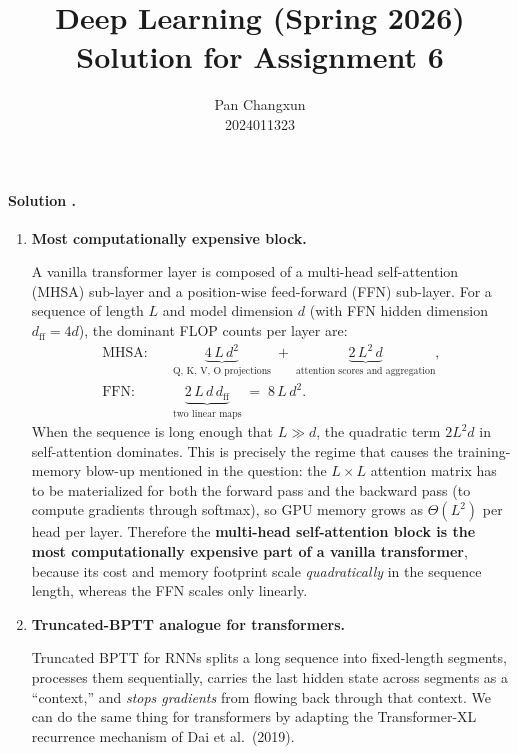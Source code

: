 \documentclass{article}
\title{
    Deep Learning (Spring 2026) \\
    Solution for Assignment 6
}
\author{
    Pan Changxun
    \\
    2024011323
}
\newcounter{solutionCount}
\newcommand{\solution}[1]{
    \stepcounter{solutionCount}
    \paragraph{Solution \thesolutionCount.}
    {
        #1
    }
}
\begin{document}
\maketitle

\solution{
    \begin{enumerate}
        \item \textbf{Most computationally expensive block.}

        A vanilla transformer layer is composed of a multi-head self-attention (MHSA) sub-layer and a position-wise feed-forward (FFN) sub-layer. For a sequence of length $L$ and model dimension $d$ (with FFN hidden dimension $d_{\mathrm{ff}} = 4d$), the dominant FLOP counts per layer are:
        \begin{align*}
            \text{MHSA}: & \quad \underbrace{4 \, L \, d^2}_{\text{Q, K, V, O projections}} \;+\; \underbrace{2 \, L^2 \, d}_{\text{attention scores and aggregation}}, \\
            \text{FFN}: & \quad \underbrace{2 \, L \, d \, d_{\mathrm{ff}}}_{\text{two linear maps}} \;=\; 8 \, L \, d^2.
        \end{align*}
        When the sequence is long enough that $L \gg d$, the quadratic term $2 L^2 d$ in self-attention dominates. This is precisely the regime that causes the training-memory blow-up mentioned in the question: the $L \times L$ attention matrix has to be materialized for both the forward pass and the backward pass (to compute gradients through softmax), so GPU memory grows as $\Theta(L^2)$ per head per layer. Therefore the \textbf{multi-head self-attention block is the most computationally expensive part of a vanilla transformer}, because its cost and memory footprint scale \emph{quadratically} in the sequence length, whereas the FFN scales only linearly.

        \item \textbf{Truncated-BPTT analogue for transformers.}

        Truncated BPTT for RNNs splits a long sequence into fixed-length segments, processes them sequentially, carries the last hidden state across segments as a ``context,'' and \emph{stops gradients} from flowing back through that context. We can do the same thing for transformers by adapting the Transformer-XL recurrence mechanism of Dai et al.~(2019).


\end{enumerate}}
\end{document}
